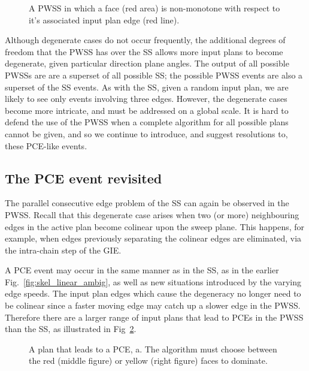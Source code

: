 \begin{figure}
  \centering
  \def\svgwidth{0.7\columnwidth}
  
  \caption[PWSS faces may not be monotone]{\label{fig:pwss_monotone}A PWSS in which a face (red area) is non-monotone with respect to it's associated input plan edge (red line).}
\end{figure}

Although degenerate cases do not occur frequently, the additional degrees of freedom that the PWSS has over the SS allows more input plans to become degenerate, given particular direction plane angles. The output of all possible PWSSs are are a superset of all possible SS; the possible PWSS events are also a superset of the SS events. As with the SS, given a random input plan, we are likely to see only events involving three edges. However, the degenerate cases become more intricate, and must be addressed on a global scale.  It is hard to defend the use of the PWSS when a complete algorithm for all possible plans cannot be given, and so we continue to introduce, and suggest resolutions to, these PCE-like events.

\subsection{The PCE event revisited}
\label{s:pce_revisited}

The parallel consecutive edge problem of the SS can again be observed in the PWSS. Recall that this degenerate case arises when two (or more) neighbouring edges in the active plan become colinear upon the sweep plane. This happens, for example, when edges previously separating the colinear edges are eliminated, via the intra-chain step of the GIE. 

A PCE event may occur in the same manner as in the SS, as in the earlier Fig.~\ref{fig:skel_linear_ambig}, as well as new situations introduced by the varying edge speeds. 
The input plan edges which cause the degeneracy no longer need to be colinear since a faster moving edge may catch up a slower edge in the PWSS. Therefore there are a larger range of input plans that lead to PCEs in the PWSS than the SS, as illustrated in Fig~\ref{fig:wss_linear_ambig_1}. 


\begin{figure}[h]
  \centering
  \def\svgwidth{1.0\columnwidth}
  
  \caption{\label{fig:wss_linear_ambig_1}A plan that leads to a PCE, a. The algorithm must choose between the red (middle figure) or yellow (right figure) faces to dominate.}
\end{figure}

